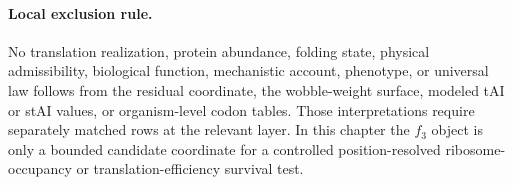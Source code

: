 \paragraph{Local exclusion rule.}
No translation realization, protein abundance, folding state, physical admissibility, biological function, mechanistic account, phenotype, or universal law follows from the residual coordinate, the wobble-weight surface, modeled tAI or stAI values, or organism-level codon tables.  Those interpretations require separately matched rows at the relevant layer.  In this chapter the $f_3$ object is only a bounded candidate coordinate for a controlled position-resolved ribosome-occupancy or translation-efficiency survival test.
